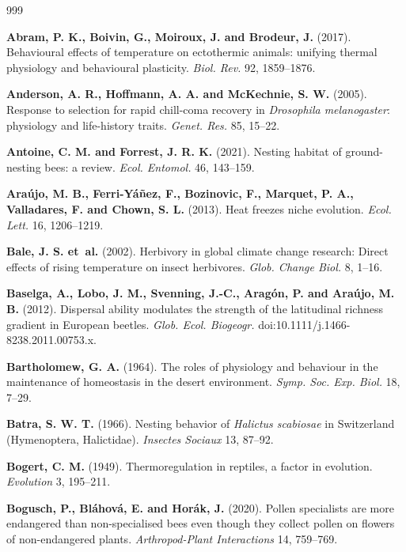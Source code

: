 \documentclass[11pt,a4paper]{article}
\begin{document}
\begin{thebibliography}{999}

\textbf{Abram, P. K., Boivin, G., Moiroux, J. and Brodeur, J.} (2017).
Behavioural effects of temperature on ectothermic animals: unifying thermal physiology and behavioural plasticity.
\textit{Biol. Rev.} 92, 1859--1876.

\textbf{Anderson, A. R., Hoffmann, A. A. and McKechnie, S. W.} (2005).
Response to selection for rapid chill-coma recovery in \textit{Drosophila melanogaster}: physiology and life-history traits.
\textit{Genet. Res.} 85, 15--22.

\textbf{Antoine, C. M. and Forrest, J. R. K.} (2021).
Nesting habitat of ground-nesting bees: a review.
\textit{Ecol. Entomol.} 46, 143--159.

\textbf{Ara{\'u}jo, M. B., Ferri-Y{\'a}{\~n}ez, F., Bozinovic, F., Marquet, P. A., Valladares, F. and Chown, S. L.} (2013).
Heat freezes niche evolution.
\textit{Ecol. Lett.} 16, 1206--1219.

\textbf{Bale, J. S. et~al.} (2002).
Herbivory in global climate change research: Direct effects of rising temperature on insect herbivores.
\textit{Glob. Change Biol.} 8, 1--16.

\textbf{Baselga, A., Lobo, J. M., Svenning, J.-C., Arag{\'o}n, P. and Ara{\'u}jo, M. B.} (2012).
Dispersal ability modulates the strength of the latitudinal richness gradient in European beetles.
\textit{Glob. Ecol. Biogeogr.} doi:10.1111/j.1466-8238.2011.00753.x.

\textbf{Bartholomew, G. A.} (1964).
The roles of physiology and behaviour in the maintenance of homeostasis in the desert environment.
\textit{Symp. Soc. Exp. Biol.} 18, 7--29.

\textbf{Batra, S. W. T.} (1966). Nesting behavior of \textit{Halictus scabiosae} in Switzerland (Hymenoptera, Halictidae). \textit{Insectes Sociaux} 13, 87--92.

\textbf{Bogert, C. M.} (1949).
Thermoregulation in reptiles, a factor in evolution.
\textit{Evolution} 3, 195--211.

\textbf{Bogusch, P., Bl\'ahov\'a, E. and Hor\'ak, J.} (2020). Pollen specialists are more endangered than non-specialised bees even though they collect pollen on flowers of non-endangered plants. \textit{Arthropod-Plant Interactions} 14, 759--769.


\end{thebibliography}
\end{document}
